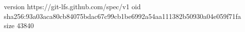 version https://git-lfs.github.com/spec/v1
oid sha256:93a03aca80cb84075bdac67c99cb1be6992a54aa111382b50930a04e059f71fa
size 43840
